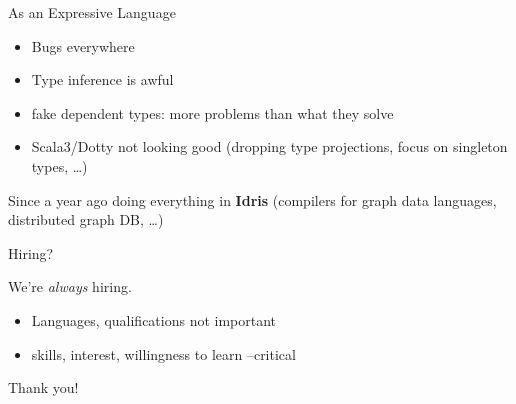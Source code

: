 \documentclass[notheorems,14pt,compress]{beamer}
\providecommand{\tightlist}{%
\setlength{\itemsep}{0pt}\setlength{\parskip}{0pt}}
\theoremstyle{definition}
\begin{document}
\begin{frame}{%
\protect\hypertarget{as-an-expressive-language}{%
As an Expressive Language}}

\begin{itemize}
\tightlist
\item
  Bugs everywhere
\item
  Type inference is awful
\item
  fake dependent types: more problems than what they solve
\item
  Scala3/Dotty not looking good (dropping type projections, focus on
  singleton types, \ldots{})
\end{itemize}

Since a year ago doing everything in \textbf{Idris} (compilers for graph
data languages, distributed graph DB, \ldots{})

\end{frame}

\begin{frame}{%
\protect\hypertarget{hiring}{%
Hiring?}}

We’re \emph{always} hiring.

\begin{itemize}
\tightlist
\item
  Languages, qualifications not important
\item
  skills, interest, willingness to learn –critical
\end{itemize}

Thank you!

\end{frame}
\end{document}

